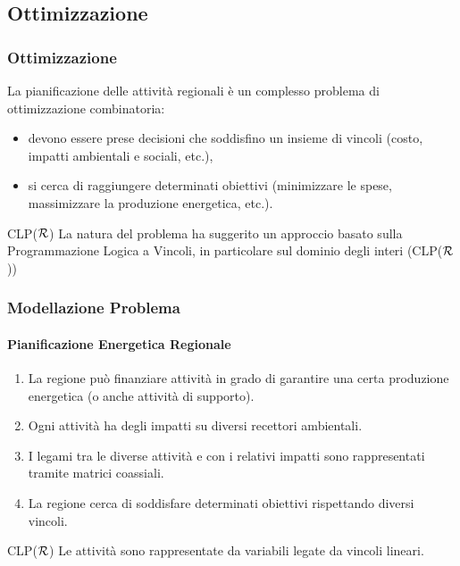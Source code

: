 \documentclass{beamer}
\newcommand{\clpr}{CLP({\ensuremath{\cal R}})}
\begin{document}
\subsection{Ottimizzazione}
	\begin{frame}
		\frametitle{Ottimizzazione}
		\begin{block}{}
			La pianificazione delle attività regionali è un complesso problema di ottimizzazione combinatoria:
			\begin{itemize}
				\item devono essere prese decisioni che soddisfino un insieme di vincoli (costo, impatti ambientali e sociali, etc.), 
				\item si cerca di raggiungere determinati obiettivi (minimizzare le spese, massimizzare la produzione energetica, etc.).
			\end{itemize}
		\end{block}
		\begin{alertblock}{\clpr}
			La natura del problema ha suggerito un approccio basato sulla Programmazione Logica a Vincoli, in particolare sul dominio degli interi (\clpr)
		\end{alertblock}
  	\end{frame}
  	\begin{frame}
		\frametitle{Modellazione Problema}
		\framesubtitle{Pianificazione Energetica Regionale}
		\begin{block}{}
			\begin{enumerate}
				\item La regione può finanziare attività in grado di garantire una certa produzione energetica (o anche attività di supporto).
				\item Ogni attività ha degli impatti su diversi recettori ambientali.
				\item I legami tra le diverse attività e con i relativi impatti sono rappresentati tramite matrici coassiali.
				\item La regione cerca di soddisfare determinati obiettivi rispettando diversi vincoli.
			\end{enumerate}
		\end{block}
		\begin{alertblock}{\clpr}
			Le attività sono rappresentate da variabili legate da vincoli lineari.
		\end{alertblock}
  	\end{frame}
  	
\end{document}
